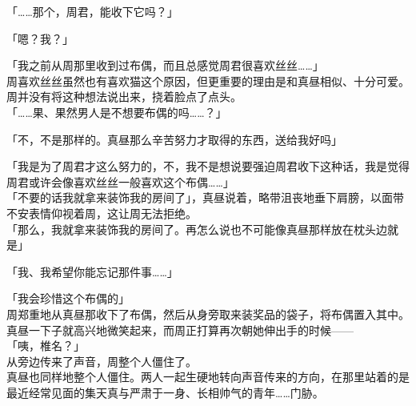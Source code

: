 「……那个，周君，能收下它吗？」

「嗯？我？」

「我之前从周那里收到过布偶，而且总感觉周君很喜欢丝丝……」\\

周喜欢丝丝虽然也有喜欢猫这个原因，但更重要的理由是和真昼相似、十分可爱。周并没有将这种想法说出来，挠着脸点了点头。\\

「……果、果然男人是不想要布偶的吗……？」

「不，不是那样的。真昼那么辛苦努力才取得的东西，送给我好吗」

「我是为了周君才这么努力的，不，我不是想说要强迫周君收下这种话，我是觉得周君或许会像喜欢丝丝一般喜欢这个布偶……」\\

「不要的话我就拿来装饰我的房间了」，真昼说着，略带沮丧地垂下肩膀，以面带不安表情仰视着周，这让周无法拒绝。\\

「那么，我就拿来装饰我的房间了。再怎么说也不可能像真昼那样放在枕头边就是」

「我、我希望你能忘记那件事……」

「我会珍惜这个布偶的」\\

周郑重地从真昼那收下了布偶，然后从身旁取来装奖品的袋子，将布偶置入其中。\\

真昼一下子就高兴地微笑起来，而周正打算再次朝她伸出手的时候——\\

「咦，椎名？」\\

从旁边传来了声音，周整个人僵住了。\\

真昼也同样地整个人僵住。两人一起生硬地转向声音传来的方向，在那里站着的是最近经常见面的集天真与严肃于一身、长相帅气的青年……门胁。
